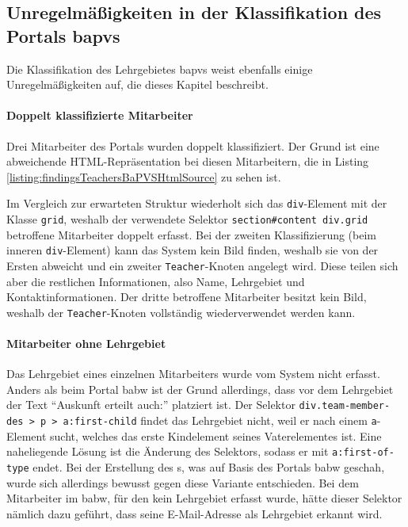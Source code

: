 \subsection{Unregelmäßigkeiten in der Klassifikation des Portals \acrshort{bapvs}}
    \label{section:findingsTeachersAbnormalitiesBaPVS}
    Die Klassifikation des Lehrgebietes \gls{bapvs}
    weist ebenfalls einige Unregelmäßigkeiten auf,
    die dieses Kapitel beschreibt.

    \paragraph{Doppelt klassifizierte Mitarbeiter}
    Drei Mitarbeiter des Portals wurden doppelt klassifiziert.
    Der Grund ist eine abweichende HTML-Repräsentation bei diesen Mitarbeitern,
    die in Listing \ref{listing:findingsTeachersBaPVSHtmlSource} zu sehen ist.

    

    Im Vergleich zur erwarteten Struktur wiederholt sich
    das \texttt{div}-Element mit der Klasse \texttt{grid},
    weshalb der verwendete Selektor \texttt{section\#content div.grid}
    betroffene Mitarbeiter doppelt erfasst.
    Bei der zweiten Klassifizierung
    (beim inneren \texttt{div}-Element) kann das System kein Bild finden,
    weshalb sie von der Ersten abweicht und ein zweiter \texttt{Teacher}-Knoten angelegt wird.
    Diese teilen sich aber die restlichen Informationen,
    also Name, Lehrgebiet und Kontaktinformationen.
    Der dritte betroffene Mitarbeiter besitzt kein Bild,
    weshalb der \texttt{Teacher}-Knoten vollständig wiederverwendet werden kann.

    \paragraph{Mitarbeiter ohne Lehrgebiet}
    Das Lehrgebiet eines einzelnen Mitarbeiters wurde vom System nicht erfasst.
    Anders als beim Portal \gls{babw} ist der Grund allerdings,
    dass vor dem Lehrgebiet der Text "`Auskunft erteilt auch:"' platziert ist.
    Der Selektor \texttt{div.team-member-des > p > a:first-child} findet
    das Lehrgebiet nicht, weil er nach einem \texttt{a}-Element sucht,
    welches das erste Kindelement seines Vaterelementes ist.
    Eine naheliegende Lösung ist die Änderung des Selektors,
    sodass er mit \texttt{a:first-of-type} endet.
    Bei der Erstellung des {\classificationModel}s,
    was auf Basis des Portals \gls{babw} geschah,
    wurde sich allerdings bewusst gegen diese Variante entschieden.
    Bei dem Mitarbeiter im \gls{babw}, für den kein Lehrgebiet erfasst
    wurde,
    hätte dieser Selektor nämlich dazu geführt,
    dass seine E-Mail-Adresse als Lehrgebiet erkannt wird.

